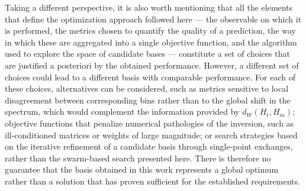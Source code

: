 Taking a different perspective, it is also worth mentioning that all the elements that define the optimization approach followed here — the observable on which it is performed, the metrics chosen to quantify the quality of a prediction, the way in which these are aggregated into a single objective function, and the algorithm used to explore the space of candidate bases — constitute a set of choices that are justified a posteriori by the obtained performance. However, a different set of choices could lead to a different basis with comparable performance. For each of these choices, alternatives can be considered, such as metrics sensitive to local disagreement between corresponding bins rather than to the global shift in the spectrum, which would complement the information provided by $d_W(H_{t},H_{m})$; objective functions that penalize numerical pathologies of the inversion, such as ill-conditioned matrices or weights of large magnitude; or search strategies based on the iterative refinement of a candidate basis through single-point exchanges, rather than the swarm-based search presented here. There is therefore no guarantee that the basis obtained in this work represents a global optimum rather than a solution that has proven sufficient for the established requirements.\medskip



